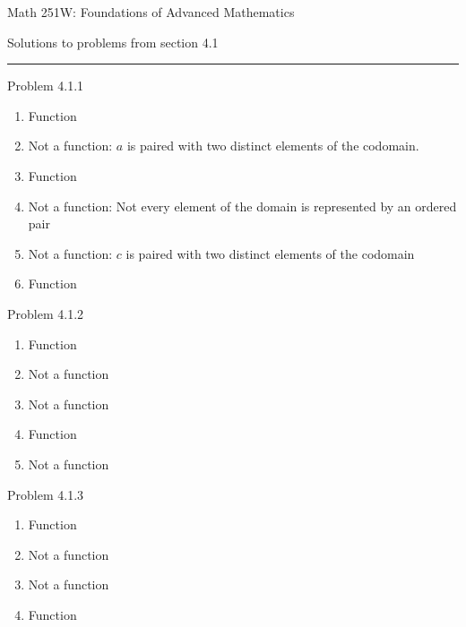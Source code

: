 \documentclass{article}
\theoremstyle{definition}
\begin{document}
	\begin{center}
		\Large{Math 251W: Foundations of Advanced Mathematics}

		\normalsize Solutions to problems from section 4.1 \hrule
		\vspace{0.4cm}

	\end{center}


	\noindent Problem 4.1.1  \vspace{0.3cm}

	\begin{enumerate}
		\item Function
		\item Not a function:  $a$ is paired with two distinct elements of
		the codomain.
		\item Function
		\item Not a function: Not every element of the domain is represented
		by an ordered pair
		\item Not a function:  $c$ is paired with two distinct elements of
		the codomain
		\item Function
	\end{enumerate}

	\vspace{1cm}


	\noindent Problem 4.1.2  \vspace{0.3cm}

	\begin{enumerate}
		\item Function
		\item Not a function
		\item Not a function
		\item Function
		\item Not a function
	\end{enumerate}

	\vspace{1cm}


	\noindent Problem 4.1.3  \vspace{0.3cm}

	\begin{enumerate}
		\item[i] Function
		\item[ii] Not a function
		\item[iii] Not a function
		\item[iv] Function
	\end{enumerate}
\end{document}
